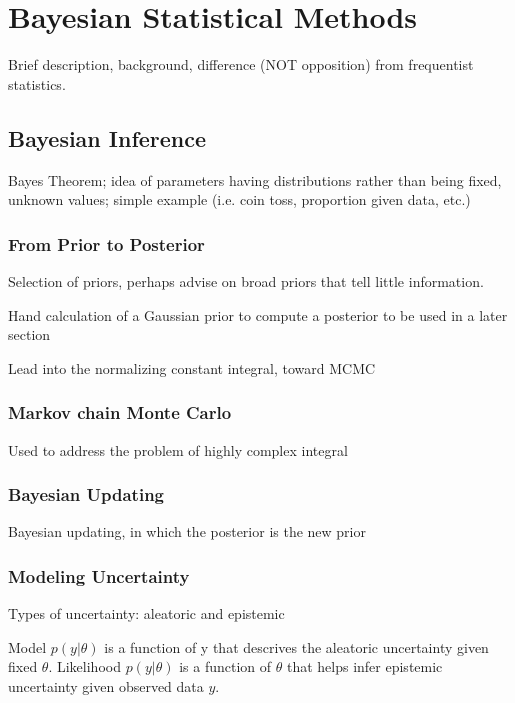 \chapter{Bayesian Statistical Methods}

Brief description, background, difference (NOT opposition) from frequentist statistics.


\section{Bayesian Inference} %

Bayes Theorem; idea of parameters having distributions rather than being fixed, unknown values; simple example (i.e. coin toss, proportion given data, etc.) 


\subsection{From Prior to Posterior}

Selection of priors, perhaps advise on broad priors that tell little information.

Hand calculation of a Gaussian prior to compute a posterior to be used in a later section


Lead into the normalizing constant integral, toward MCMC


\subsection{Markov chain Monte Carlo}
Used to address the problem of highly complex integral


\subsection{Bayesian Updating}

Bayesian updating, in which the posterior is the new prior

\subsection{Modeling Uncertainty}

Types of uncertainty: aleatoric and epistemic

Model $p(y|\theta)$ is a function of y that descrives the aleatoric uncertainty given fixed $\theta$.
Likelihood $p(y|\theta)$ is a function of $\theta$ that helps infer epistemic uncertainty given observed data $y$.


